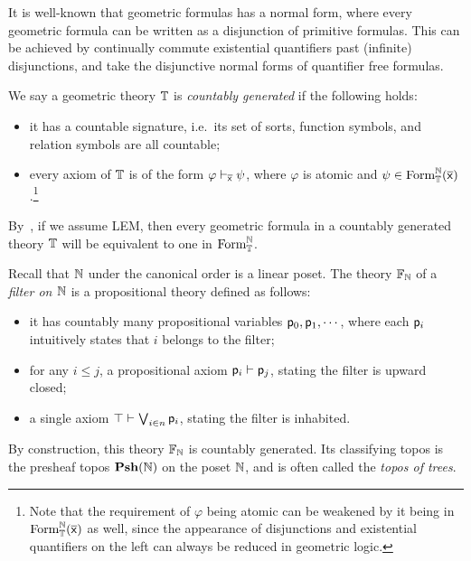 \begin{remark}\label{rem:normalformofgeometric}
  It is well-known that geometric formulas has a normal form, where every geometric formula can be written as a disjunction of primitive formulas. This can be achieved by continually commute existential quantifiers past (infinite) disjunctions, and take the disjunctive normal forms of quantifier free formulas.
\end{remark}

\begin{definition}\label{def:countablyseparated}
  We say a geometric theory $\mathbb{T}$ is \emph{countably generated} if the following holds:
  \begin{itemize}
    \item it has a countable signature, i.e.\ its set of sorts, function symbols, and relation symbols are all countable;
    \item every axiom of $\mathbb{T}$ is of the form $\varphi \vdash_{\overline{\mathsf{x}}} \psi$, where $\varphi$ is atomic and $\psi \in \mathrm{Form}^{\mathbb{N}}_{\mathbb{T}}(\overline{\mathsf{x}})$.\footnote{Note that the requirement of $\varphi$ being atomic can be weakened by it being in $\mathrm{Form}^{\mathbb{N}}_{\mathbb{T}}(\overline{\mathsf{x}})$ as well, since the appearance of disjunctions and existential quantifiers on the left can always be reduced in geometric logic.}
  \end{itemize}
\end{definition}

\begin{remark}
  By~, if we assume \gls{LEM}, then every geometric formula in a countably generated theory $\mathbb{T}$ will be equivalent to one in $\mathrm{Form}^{\mathbb{N}}_{\mathbb{T}}$.
\end{remark}

\begin{example}\label{exa:toposoftrees}
  Recall that $\mathbb{N}$ under the canonical order is a linear poset. The theory $\mathbb{F}_{\mathbb{N}}$ of a \emph{filter on $\mathbb{N}$} is a propositional theory defined as follows:
  \begin{itemize}
    \item it has countably many propositional variables $\mathsf{p}_0,\mathsf{p}_1,\cdots$, where each $\mathsf{p}_i$ intuitively states that $i$ belongs to the filter;
    \item for any $i \le j$, a propositional axiom $\mathsf{p}_i \vdash \mathsf{p}_j$, stating the filter is upward closed;
    \item a single axiom $\top \vdash \bigvee_{i\in n}\mathsf{p}_i$, stating the filter is inhabited.
  \end{itemize}
  By construction, this theory $\mathbb{F}_{\mathbb{N}}$ is countably generated. Its classifying topos is the presheaf topos $\mathbf{Psh}(\mathbb{N})$ on the poset $\mathbb{N}$, and is often called the \emph{topos of trees}.
\end{example}

